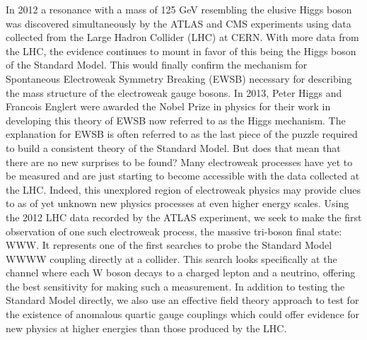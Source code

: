 \begin{abstractpage}
In 2012 a resonance with a mass of 125 GeV resembling the elusive Higgs boson was discovered simultaneously by the ATLAS and CMS experiments using data collected from the Large Hadron Collider (LHC) at CERN.  With more data from the LHC, the evidence continues to mount in favor of this being the Higgs boson of the Standard Model.  This would finally confirm the mechanism for Spontaneous Electroweak Symmetry Breaking (EWSB) necessary for describing the mass structure  of the electroweak gauge bosons.  In 2013, Peter Higgs and Francois Englert were awarded the Nobel Prize in physics for their work in developing this theory of EWSB now referred to as the Higgs mechanism.  The explanation for EWSB is often referred to as the last piece of the puzzle required to build a consistent theory of the Standard Model.  But does that mean that there are no new surprises to be found? Many electroweak processes have yet to be measured and are just starting to become accessible with the data collected at the LHC.  Indeed, this unexplored region of electroweak physics may provide clues to as of yet unknown new physics processes at even higher energy scales.  Using the 2012 LHC data recorded by the ATLAS experiment, we seek to make the first observation of one such electroweak process, the massive tri-boson final state: WWW.  It represents one of the first searches to probe the Standard Model WWWW coupling directly at a collider.  This search looks specifically at the channel where each W boson decays to a charged lepton and a neutrino, offering the best sensitivity for making such a measurement.  In addition to testing the Standard Model directly, we also use an effective field theory approach to test for the existence of anomalous quartic gauge couplings which could offer evidence for new physics at higher energies than those produced by the LHC.
\end{abstractpage}
